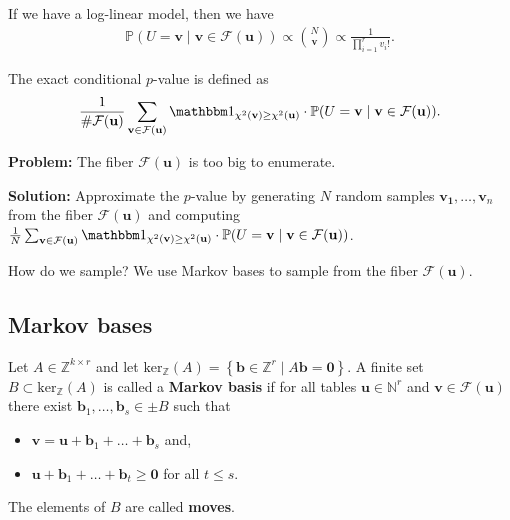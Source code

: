 \begin{cor}
  If we have a log-linear model, then we have 
  \begin{align*}
    \mathbb{P}(U = \mathbf{v} \mid \mathbf{v} \in \mathcal{F}(\mathbf{u})) \propto {N \choose \mathbf{v}} \propto \frac{1}{\prod^r_{i=1} v_i!}.
  \end{align*}
\end{cor}

\begin{defi}
  The exact conditional \( p \)-value is defined as 
  \begin{align*}
    \frac{1}{\# \mathcal{F}(\mathbf{u})} \sum_{\mathbf{v} \in \mathcal{F}(\mathbf{u})} \mathbbm 1_{\chi^2(\mathbf{v}) \geq \chi^2(\mathbf u)} \cdot \mathbb{P}(U = \mathbf{v} \mid \mathbf{v} \in \mathcal{F}(\mathbf{u})).
  \end{align*}
\end{defi}

\textbf{Problem:} The fiber \( \mathcal{F}(\mathbf{u}) \) is too big to enumerate.

\textbf{Solution:} Approximate the \( p \)-value by generating \( N \) random samples \( \mathbf{v_1}, \dots, \mathbf{v}_n \) from the fiber \( \mathcal{F}(\mathbf{u}) \) and computing \( \frac{1}{N} \sum_{\mathbf{v} \in \mathcal{F}(\mathbf{u})} \mathbbm 1_{\chi^2(\mathbf{v}) \geq \chi^2(\mathbf u)} \cdot \mathbb{P}(U = \mathbf{v} \mid \mathbf{v} \in \mathcal{F}(\mathbf{u})) \).

\vspace*{1em}

How do we sample? We use Markov bases to sample from the fiber \( \mathcal{F}(\mathbf{u}) \).

\subsection{Markov bases}

\begin{defi}
  Let \( A \in \mathbb{Z}^{k \times r} \) and let \( \mathrm{ker}_{\mathbb{Z}}(A) = \left\{ \mathbf{b} \in \mathbb{Z}^r \mid A \mathbf{b} = \mathbf{0} \right\} \). A finite set \( B \subset \mathrm{ker}_{\mathbb{Z}}(A)\)  is called a \textbf{Markov basis} if for all tables \( \mathbf{u} \in \mathbb{N}^r \) and \( \mathbf{v} \in \mathcal{F}(\mathbf{u}) \) there exist \( \mathbf{b}_1, \dots, \mathbf{b}_s \in \pm B \) such that 
  \begin{itemize}
    \item \( \mathbf{v} = \mathbf{u} + \mathbf{b}_1 + \dots + \mathbf{b}_s \) and,
    \item \( \mathbf{u} + \mathbf{b}_1 + \dots + \mathbf{b}_t \geq \mathbf{0} \) for all \( t \leq s \).
  \end{itemize}
  The elements of \( B \) are called \textbf{moves}.
\end{defi}

